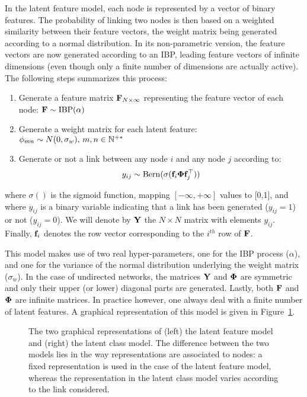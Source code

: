 In the latent feature model, each node is represented by a vector of binary features. The probability of linking two nodes is then based on a weighted similarity between their feature vectors, the weight matrix being generated according to a normal distribution. In its non-parametric version, the feature vectors are now generated according to an IBP, leading feature vectors of infinite dimensions (even though only a finite number of dimensions are actually active). The following steps summarizes this process:
%
\begin{enumerate}
\item Generate a feature matrix $\mathbf{F}_{N \times \infty}$ representing the feature vector of each node: $\mathbf{F} \sim \mathrm{IBP}(\alpha)$
\item Generate a weight matrix for each latent feature:\\
 $\mathbf{\phi}_{mn} \sim N(0, \sigma_w), \, m,n \in \mathbb{N}^{+*}$
\item Generate or not a link between any node $i$ and any node $j$ according to: 
%
\begin{equation}
y_{ij} \sim \mathrm{Bern}(\sigma(\mat{f}_{i} \mat{\Phi} \mat{f}_{j}^\top))
\label{eq:link-ilfm}
\end{equation}
\end{enumerate}
%
where $\sigma()$ is the sigmoid function, mapping $[-\infty, +\infty]$ values to [0,1], and where $y_{ij}$ is a binary variable indicating that a link has been generated ($y_{ij}=1$) or not ($y_{ij}=0$). We will denote by $\mathbf{Y}$ the $N \times N$ matrix with elements $y_{ij}$. Finally, $\mathbf{f}_{i}$ denotes the row vector corresponding to the $i^{th}$ row of $\mathbf{F}$.

This model makes use of two real hyper-parameters, one for the IBP process ($\alpha$), and one for the variance of the normal distribution underlying the weight matrix ($\sigma_w$). In the case of undirected networks, the matrices $\mathbf{Y}$ and $\mathbf{\Phi}$ are symmetric and only their upper (or lower) diagonal parts are generated. Lastly, both $\mathbf{F}$ and $\mathbf{\Phi}$ are infinite matrices. In practice however, one always deal with a finite number of latent features. A graphical representation of this model is given in Figure~\ref{fig:ilfrm}.

\begin{figure}[t]
	\centering
	\vspace{1cm}
	\scalebox{0.88}{
	}
	\endminipage
	\scalebox{0.88}{
		}
	\endminipage
	\caption{The two graphical representations of (left) the latent feature model and (right) the latent class model. The difference between the two models lies in the way representations are associated to nodes: a fixed representation is used in the case of the latent feature model, whereas the representation in the latent class model varies according to the link considered.}
	\label{fig:ilfrm}
\end{figure}

